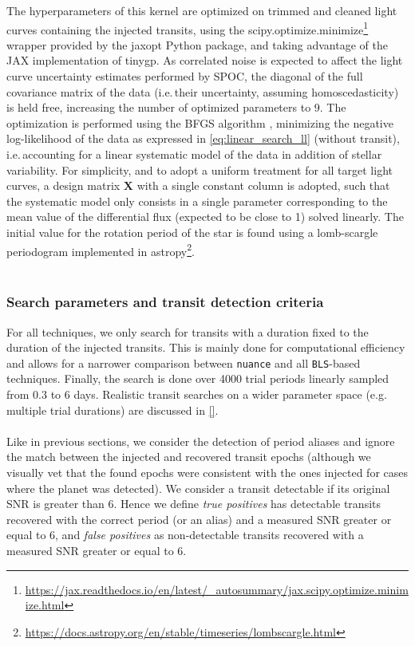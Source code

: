 \documentclass{aastex631}
\newcommand{\footlink}[1]{\footnote{\url{#1}}}
\begin{document}
The hyperparameters of this kernel are optimized on trimmed and cleaned light curves containing the injected transits, using the \textsf{scipy.optimize.minimize}\footlink{https://jax.readthedocs.io/en/latest/_autosummary/jax.scipy.optimize.minimize.html} wrapper provided by the \textsf{jaxopt} Python package, and taking advantage of the \textsf{JAX} implementation of \textsf{tinygp}. As correlated noise is expected to affect the light curve uncertainty estimates performed by SPOC, the diagonal of the full covariance matrix of the data (i.e.\,their uncertainty, assuming homoscedasticity) is held free, increasing the number of optimized parameters to 9. The optimization is performed using the \textsf{BFGS} algorithm \citep{Fletcher1987}, minimizing the negative log-likelihood of the data as expressed in \autoref{eq:linear_search_ll} (without transit), i.e.\,accounting for a linear systematic model of the data in addition of stellar variability. For simplicity, and to adopt a uniform treatment for all target light curves, a design matrix $\bm{X}$ with a single constant column is adopted, such that the systematic model only consists in a single parameter corresponding to the mean value of the differential flux (expected to be close to 1) solved linearly. The initial value for the rotation period of the star is found using a lomb-scargle periodogram \citep{Lomb1976, Scargle1982} implemented in \textsf{astropy}\footlink{https://docs.astropy.org/en/stable/timeseries/lombscargle.html}.\\\\

\subsubsection*{Search parameters and transit detection criteria}
For all techniques, we only search for transits with a duration fixed to the duration of the injected transits. This is mainly done for computational efficiency and allows for a narrower comparison between \texttt{nuance} and all \texttt{BLS}-based techniques. Finally, the search is done over 4000 trial periods linearly sampled from 0.3 to 6 days. Realistic transit searches on a wider parameter space (e.g. multiple trial durations) are discussed in \autoref{}.\\\\
Like in previous sections, we consider the detection of period aliases and ignore the match between the injected and recovered transit epochs (although we visually vet that the found epochs were consistent with the ones injected for cases where the planet was detected). We consider a transit detectable if its original SNR is greater than 6. Hence we define \textit{true positives} has detectable transits recovered with the correct period (or an alias) and a measured SNR greater or equal to 6, and \textit{false positives} as non-detectable transits recovered with a measured SNR greater or equal to 6.
\end{document}
